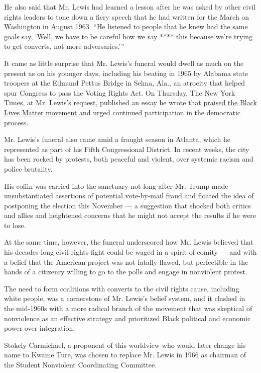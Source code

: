 He also said that Mr. Lewis had learned a lesson after he was asked by
other civil rights leaders to tone down a fiery speech that he had
written for the March on Washington in August 1963. ``He listened to
people that he knew had the same goals say, `Well, we have to be careful
how we say **** this because we're trying to get converts, not more
adversaries.'''

It came as little surprise that Mr. Lewis's funeral would dwell as much
on the present as on his younger days, including his beating in 1965 by
Alabama state troopers at the Edmund Pettus Bridge in Selma, Ala., an
atrocity that helped spur Congress to pass the Voting Rights Act. On
Thursday, The New York Times, at Mr. Lewis's request, published an essay
he wrote that
\href{https://www.nytimes.com/2020/07/30/opinion/john-lewis-civil-rights-america.html}{praised
the Black Lives Matter movement} and urged continued participation in
the democratic process.

Mr. Lewis's funeral also came amid a fraught season in Atlanta, which he
represented as part of his Fifth Congressional District. In recent
weeks, the city has been rocked by protests, both peaceful and violent,
over systemic racism and police brutality.

His coffin was carried into the sanctuary not long after Mr. Trump made
unsubstantiated assertions of potential vote-by-mail fraud and floated
the idea of postponing the election this November --- a suggestion that
shocked both critics and allies and heightened concerns that he might
not accept the results if he were to lose.

At the same time, however, the funeral underscored how Mr. Lewis
believed that his decades-long civil rights fight could be waged in a
spirit of comity --- and with a belief that the American project was not
fatally flawed, but perfectible in the hands of a citizenry willing to
go to the polls and engage in nonviolent protest.

The need to form coalitions with converts to the civil rights cause,
including white people, was a cornerstone of Mr. Lewis's belief system,
and it clashed in the mid-1960s with a more radical branch of the
movement that was skeptical of nonviolence as an effective strategy and
prioritized Black political and economic power over integration.

Stokely Carmichael, a proponent of this worldview who would later change
his name to Kwame Ture, was chosen to replace Mr. Lewis in 1966 as
chairman of the Student Nonviolent Coordinating Committee.

